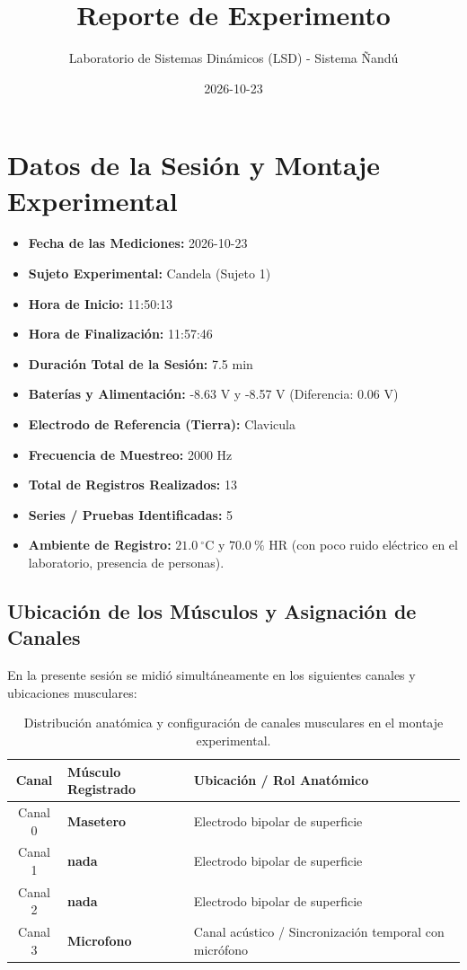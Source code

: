 \documentclass[11pt,a4paper]{article}
\title{\textbf{Reporte de Experimento}}
\author{Laboratorio de Sistemas Dinámicos (LSD) - Sistema Ñandú}
\date{2026-10-23}
\begin{document}
\maketitle

\section{Datos de la Sesión y Montaje Experimental}
\begin{itemize}
    \item \textbf{Fecha de las Mediciones:} 2026-10-23
    \item \textbf{Sujeto Experimental:} Candela (Sujeto 1)
    \item \textbf{Hora de Inicio:} 11:50:13
    \item \textbf{Hora de Finalización:} 11:57:46
    \item \textbf{Duración Total de la Sesión:} 7.5 min
    \item \textbf{Baterías y Alimentación:} -8.63 V y -8.57 V (Diferencia: 0.06 V)
    \item \textbf{Electrodo de Referencia (Tierra):} Clavicula
    \item \textbf{Frecuencia de Muestreo:} 2000 Hz
    \item \textbf{Total de Registros Realizados:} 13
    \item \textbf{Series / Pruebas Identificadas:} 5
    \item \textbf{Ambiente de Registro:} $21.0\ ^\circ\text{C}$ y $70.0\ \%\text{ HR}$ (con poco ruido eléctrico en el laboratorio, presencia de personas).
\end{itemize}

\subsection{Ubicación de los Músculos y Asignación de Canales}
En la presente sesión se midió simultáneamente en los siguientes canales y ubicaciones musculares:
\begin{table}[H]
\centering
\begin{tabularx}{\textwidth}{c p{6.5cm} X}
\toprule
\textbf{Canal} & \textbf{Músculo Registrado} & \textbf{Ubicación / Rol Anatómico} \\
\midrule
Canal 0 & \textbf{Masetero} & Electrodo bipolar de superficie \\
Canal 1 & \textbf{nada} & Electrodo bipolar de superficie \\
Canal 2 & \textbf{nada} & Electrodo bipolar de superficie \\
Canal 3 & \textbf{Microfono} & Canal acústico / Sincronización temporal con micrófono \\
\bottomrule
\end{tabularx}
\caption{Distribución anatómica y configuración de canales musculares en el montaje experimental.}
\end{table}
\end{document}
